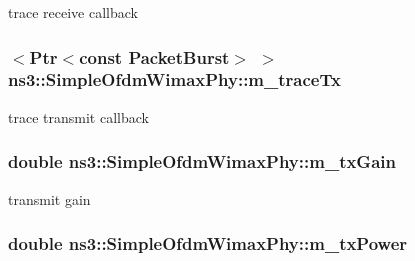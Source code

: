 trace receive callback 

\subsubsection[{\texorpdfstring{m\+\_\+trace\+Tx}{m_traceTx}}]{$<${\bf Ptr}$<$const {\bf Packet\+Burst}$>$ $>$ ns3\+::\+Simple\+Ofdm\+Wimax\+Phy\+::m\+\_\+trace\+Tx\hspace{0.3cm}{\ttfamily [private]}}\hypertarget{classns3_1_1SimpleOfdmWimaxPhy_a85b3dfc29714e193dafe64349fb855d7}{}\label{classns3_1_1SimpleOfdmWimaxPhy_a85b3dfc29714e193dafe64349fb855d7}


trace transmit callback 

\subsubsection[{\texorpdfstring{m\+\_\+tx\+Gain}{m_txGain}}]{\setlength{\rightskip}{0pt plus 5cm}double ns3\+::\+Simple\+Ofdm\+Wimax\+Phy\+::m\+\_\+tx\+Gain\hspace{0.3cm}{\ttfamily [private]}}\hypertarget{classns3_1_1SimpleOfdmWimaxPhy_a2997c003cdde2c86a4ee6a5de5e04e8a}{}\label{classns3_1_1SimpleOfdmWimaxPhy_a2997c003cdde2c86a4ee6a5de5e04e8a}


transmit gain 

\subsubsection[{\texorpdfstring{m\+\_\+tx\+Power}{m_txPower}}]{\setlength{\rightskip}{0pt plus 5cm}double ns3\+::\+Simple\+Ofdm\+Wimax\+Phy\+::m\+\_\+tx\+Power\hspace{0.3cm}{\ttfamily [private]}}\hypertarget{classns3_1_1SimpleOfdmWimaxPhy_a125a367d9d6b859d95df1fd2d964ed23}{}\label{classns3_1_1SimpleOfdmWimaxPhy_a125a367d9d6b859d95df1fd2d964ed23}


